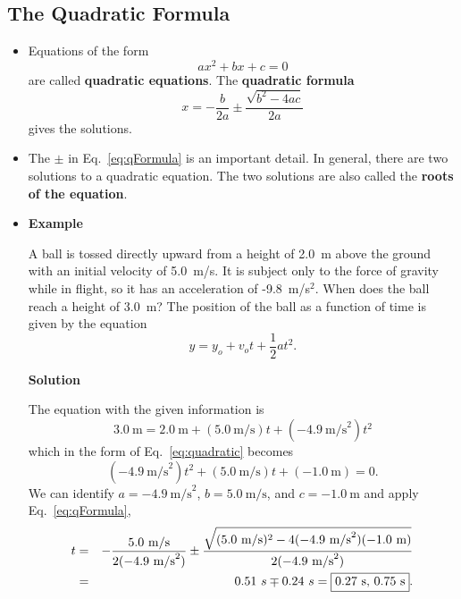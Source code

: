 \documentclass[12pt]{article}
\begin{document}
\begin{latexonly}
\subsection*{The Quadratic Formula}
\end{latexonly}

\begin{itemize}
\item Equations of the form
\begin{equation}
\label{eq:quadratic}
ax^2 + bx + c = 0
\end{equation}
are called \textbf{quadratic equations}. The \textbf{quadratic formula}
\begin{equation}
\label{eq:qFormula}
x = -\frac{b}{2a} \pm \frac{\sqrt{b^2 - 4ac}}{2a}
\end{equation}
gives the solutions.

\item The $\pm$ in Eq.~\ref{eq:qFormula} is an important detail. In
general, there are two solutions to a quadratic equation. The two
solutions are also called the \textbf{roots of the
equation}.

\item \textbf{Example}

A ball is tossed directly upward from a height of 2.0~m above the ground
with an initial velocity of 5.0~m/s. It is subject only to the force
of gravity while in flight, so it has an acceleration of
-9.8~m/s$^2$. When does the ball reach a height of 3.0~m? The position
of the ball as a function of time is given by the equation
\[
y = y_o + v_o t + \frac{1}{2}a t^2.
\]

\textbf{Solution}

The equation with the given information is
\[
3.0~\mathrm{m} = 2.0~\mathrm{m} + (5.0~\mathrm{m/s}) t 
+ (-4.9~\mathrm{m/s}^2) t^2
\]
which in the form of Eq.~\ref{eq:quadratic} becomes
\begin{equation}
\label{eq:example}
(-4.9~\mathrm{m/s}^2) t^2 + (5.0~\mathrm{m/s}) t + (-1.0~\mathrm{m}) = 0.
\end{equation}
We can identify $a =-4.9~\mathrm{m/s}^2$, $b = 5.0~\mathrm{m/s}$, and
$c = -1.0~\mathrm{m}$ and apply Eq.~\ref{eq:qFormula},
\begin{eqnarray}
t &=& -\frac{5.0~\mathrm{m/s}}{2(-4.9~\mathrm{m/s}^2)} 
\pm \frac{\sqrt{(5.0~\mathrm{m/s})^2 - 
          4(-4.9~\mathrm{m/s}^2)(-1.0~\mathrm{m})}}
{2(-4.9~\mathrm{m/s}^2)}\\
  &=& 0.51~s \mp 0.24~s = \framebox{0.27~s, 0.75~s}.
\end{eqnarray}


\end{itemize}
\end{document}
